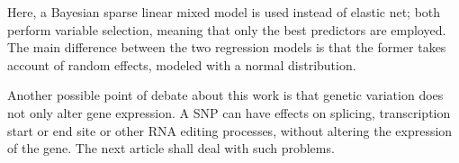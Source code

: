 \documentclass[../main.tex]{subfiles}
\begin{document}
Here, a Bayesian sparse linear mixed model is used instead of elastic 
net; both perform variable selection, meaning that only the best 
predictors are employed. The main difference between the two regression 
models is that the former takes account of random effects, modeled with 
a normal distribution.

Another possible point of debate about this work is that genetic 
variation does not only alter gene expression. A SNP can have effects on 
splicing, transcription start or end site or other RNA editing 
processes, without altering the expression of the gene. The next article 
shall deal with such problems.
\end{document}

